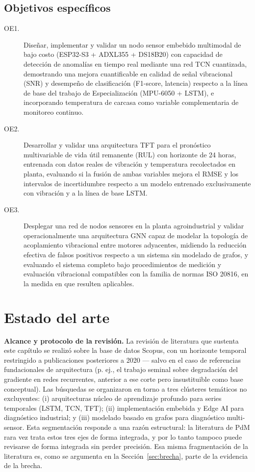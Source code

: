 \documentclass[11pt]{article}
\begin{document}
\subsection{Objetivos específicos}
\begin{description}
    \item[OE1.] Diseñar, implementar y validar un nodo sensor embebido multimodal de bajo costo (ESP32-S3 + ADXL355 + DS18B20) con capacidad de detección de anomalías en tiempo real mediante una red TCN cuantizada, demostrando una mejora cuantificable en calidad de señal vibracional (SNR) y desempeño de clasificación (F1-score, latencia) respecto a la línea de base del trabajo de Especialización (MPU-6050 + LSTM), e incorporando temperatura de carcasa como variable complementaria de monitoreo continuo.

    \item[OE2.] Desarrollar y validar una arquitectura TFT para el pronóstico multivariable de vida útil remanente (RUL) con horizonte de 24 horas, entrenada con datos reales de vibración y temperatura recolectados en planta, evaluando si la fusión de ambas variables mejora el RMSE y los intervalos de incertidumbre respecto a un modelo entrenado exclusivamente con vibración y a la línea de base LSTM.

    \item[OE3.] Desplegar una red de nodos sensores en la planta agroindustrial y validar operacionalmente una arquitectura GNN capaz de modelar la topología de acoplamiento vibracional entre motores adyacentes, midiendo la reducción efectiva de falsos positivos respecto a un sistema sin modelado de grafos, y evaluando el sistema completo bajo procedimientos de medición y evaluación vibracional compatibles con la familia de normas ISO 20816, en la medida en que resulten aplicables.
\end{description}

\section{Estado del arte}
\label{sec:estado-del-arte}

\textbf{Alcance y protocolo de la revisión.} La revisión de literatura que sustenta este capítulo se realizó sobre la base de datos Scopus, con un horizonte temporal restringido a publicaciones posteriores a 2020 --- salvo en el caso de referencias fundacionales de arquitectura (p. ej., el trabajo seminal sobre degradación del gradiente en redes recurrentes, anterior a ese corte pero insustituible como base conceptual). Las búsquedas se organizaron en torno a tres clústeres temáticos no excluyentes: (i) arquitecturas núcleo de aprendizaje profundo para series temporales (LSTM, TCN, TFT); (ii) implementación embebida y Edge AI para diagnóstico industrial; y (iii) modelado basado en grafos para diagnóstico multi-sensor. Esta segmentación responde a una razón estructural: la literatura de PdM rara vez trata estos tres ejes de forma integrada, y por lo tanto tampoco puede revisarse de forma integrada sin perder precisión. Esa misma fragmentación de la literatura es, como se argumenta en la Sección~\ref{sec:brecha}, parte de la evidencia de la brecha.
\end{document}
